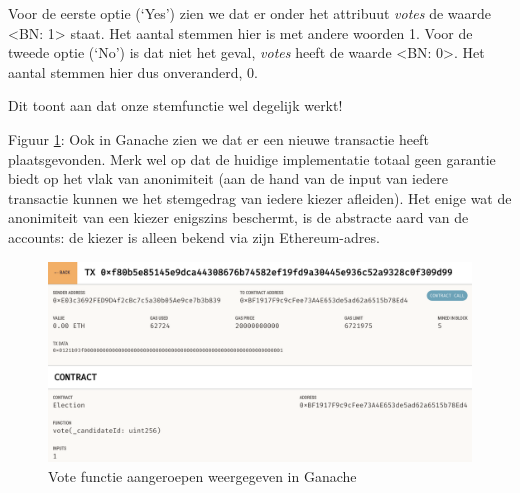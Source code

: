 	Voor de eerste optie (`Yes') zien we dat er onder het attribuut \textit{votes} de waarde <BN: 1> staat. Het aantal stemmen hier is met andere woorden 1.
	Voor de tweede optie (`No') is dat niet het geval, \textit{votes} heeft de  waarde <BN: 0>. Het aantal stemmen hier dus onveranderd, 0.
	
	Dit toont aan dat onze stemfunctie wel degelijk werkt! 
	
	Figuur \ref{fig:contracts-ganache3}: Ook in Ganache zien we dat er een nieuwe transactie heeft plaatsgevonden. Merk wel op dat de huidige implementatie totaal geen garantie biedt op het vlak van anonimiteit (aan de hand van de input van iedere transactie kunnen we het stemgedrag van iedere kiezer afleiden). Het enige wat de anonimiteit van een kiezer enigszins beschermt, is de abstracte aard van de accounts: de kiezer is alleen bekend via zijn Ethereum-adres. 
	\begin{figure}
		\includegraphics[width=\linewidth]{img/contracts-ganache3.png}
		\caption{Vote functie aangeroepen weergegeven in Ganache}
		\label{fig:contracts-ganache3}
	\end{figure}
	\newpage
